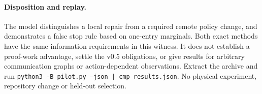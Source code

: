 \documentclass[11pt]{article}
\begin{document}
\paragraph{Disposition and replay.}
The model distinguishes a local repair from a required remote policy change, and demonstrates a false stop rule based on one-entry marginals. Both exact methods have the same information requirements in this witness. It does not establish a proof-work advantage, settle the v0.5 obligations, or give results for arbitrary communication graphs or action-dependent observations. Extract the archive and run \texttt{python3 -B pilot.py --json | cmp results.json}. No physical experiment, repository change or held-out selection.
\end{document}
